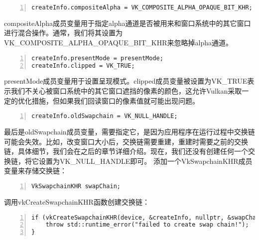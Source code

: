 \documentclass{ctexart}
\begin{document}
\begin{lstlisting}[language={[ANSI]C},keywordstyle=\color{blue!70},commentstyle=\color{red!50!green!50!blue!50},frame=shadowbox, rulesepcolor=\color{red!20!green!20!blue!20},basicstyle=\small,numbers=left, numberstyle=\tiny,breaklines=true]
createInfo.compositeAlpha = VK_COMPOSITE_ALPHA_OPAQUE_BIT_KHR;
\end{lstlisting}

compositeAlpha成员变量用于指定alpha通道是否被用来和窗口系统中的其它窗口进行混合操作。通常，我们将其设置为VK\_COMPOSITE\_ALPHA\_OPAQUE\_BIT\_KHR来忽略掉alpha通道。

\begin{lstlisting}[language={[ANSI]C},keywordstyle=\color{blue!70},commentstyle=\color{red!50!green!50!blue!50},frame=shadowbox, rulesepcolor=\color{red!20!green!20!blue!20},basicstyle=\small,numbers=left, numberstyle=\tiny,breaklines=true]
createInfo.presentMode = presentMode;
createInfo.clipped = VK_TRUE;
\end{lstlisting}

presentMode成员变量用于设置呈现模式。clipped成员变量被设置为VK\_TRUE表示我们不关心被窗口系统中的其它窗口遮挡的像素的颜色，这允许Vulkan采取一定的优化措施，但如果我们回读窗口的像素值就可能出现问题。

\begin{lstlisting}[language={[ANSI]C},keywordstyle=\color{blue!70},commentstyle=\color{red!50!green!50!blue!50},frame=shadowbox, rulesepcolor=\color{red!20!green!20!blue!20},basicstyle=\small,numbers=left, numberstyle=\tiny,breaklines=true]
createInfo.oldSwapchain = VK_NULL_HANDLE;
\end{lstlisting}

最后是oldSwapchain成员变量，需要指定它，是因为应用程序在运行过程中交换链可能会失效。比如，改变窗口大小后，交换链需要重建，重建时需要之前的交换链，具体细节，我们会在之后的章节详细介绍。现在，我们还没有创建任何一个交换链，将它设置为VK\_NULL\_HANDLE即可。
添加一个VkSwapchainKHR成员变量来存储交换链：

\begin{lstlisting}[language={[ANSI]C},keywordstyle=\color{blue!70},commentstyle=\color{red!50!green!50!blue!50},frame=shadowbox, rulesepcolor=\color{red!20!green!20!blue!20},basicstyle=\small,numbers=left, numberstyle=\tiny,breaklines=true]
VkSwapchainKHR swapChain;
\end{lstlisting}

调用vkCreateSwapchainKHR函数创建交换链：

\begin{lstlisting}[language={[ANSI]C},keywordstyle=\color{blue!70},commentstyle=\color{red!50!green!50!blue!50},frame=shadowbox, rulesepcolor=\color{red!20!green!20!blue!20},basicstyle=\small,numbers=left, numberstyle=\tiny,breaklines=true]
if (vkCreateSwapchainKHR(device, &createInfo, nullptr, &swapChain) != VK_SUCCESS) {
	throw std::runtime_error("failed to create swap chain!");
}
\end{lstlisting}
\end{document}
